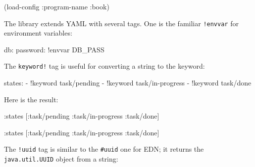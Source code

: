 \begin{english}
\end{english}

\begin{english}
  \begin{clojure}
(load-config {:program-name :book})
  \end{clojure}
\end{english}

The library extends YAML with several tags. One is the familiar \verb|!envvar| for environment variables:


\begin{english}
  \begin{yaml}
db:
  password: !envvar DB_PASS
  \end{yaml}
\end{english}

\noindent
The \verb|keyword!| tag is useful for converting a string to the keyword:

\begin{english}
  \begin{yaml}
states:
  - !keyword task/pending
  - !keyword task/in-progress
  - !keyword task/done
  \end{yaml}
\end{english}

\noindent
Here is the result:

\ifx\DEVICETYPE\MOBILE

\begin{english}
  \begin{clojure}
{:states [:task/pending
          :task/in-progress
          :task/done]}
  \end{clojure}
\end{english}

\else

\begin{english}
  \begin{clojure}
{:states [:task/pending :task/in-progress :task/done]}
  \end{clojure}
\end{english}

\fi

The \verb|!uuid| tag is similar to the \verb|#uuid| one for EDN; it returns the \verb|java.util.UUID| object from a string:

